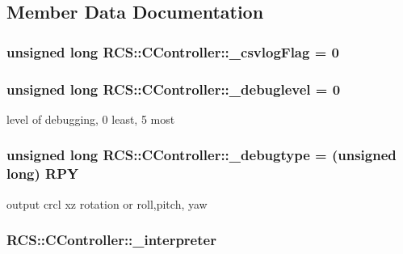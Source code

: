 \subsection{Member Data Documentation}
\hypertarget{structRCS_1_1CController_ab52a91aa3bfa1f56b527217f09c66912}{
\subsubsection[{\-\_\-csvlog\-Flag}]{\setlength{\rightskip}{0pt plus 5cm}unsigned long R\-C\-S\-::\-C\-Controller\-::\-\_\-csvlog\-Flag = 0\hspace{0.3cm}{\ttfamily [static]}}}\label{structRCS_1_1CController_ab52a91aa3bfa1f56b527217f09c66912}
\hypertarget{structRCS_1_1CController_a1e7f92c361c961fae03b08986bc19a16}{
\subsubsection[{\-\_\-debuglevel}]{\setlength{\rightskip}{0pt plus 5cm}unsigned long R\-C\-S\-::\-C\-Controller\-::\-\_\-debuglevel = 0\hspace{0.3cm}{\ttfamily [static]}}}\label{structRCS_1_1CController_a1e7f92c361c961fae03b08986bc19a16}
level of debugging, 0 least, 5 most \hypertarget{structRCS_1_1CController_ae4ff5cead0f30ebf8dcbc850b342afc4}{
\subsubsection[{\-\_\-debugtype}]{\setlength{\rightskip}{0pt plus 5cm}unsigned long R\-C\-S\-::\-C\-Controller\-::\-\_\-debugtype = (unsigned long) {\bf R\-P\-Y}\hspace{0.3cm}{\ttfamily [static]}}}\label{structRCS_1_1CController_ae4ff5cead0f30ebf8dcbc850b342afc4}
output crcl xz rotation or roll,pitch, yaw \hypertarget{structRCS_1_1CController_a4c3c287cebfd9fa9fb413205fa0b49f6}{
\subsubsection[{\-\_\-interpreter}]{ R\-C\-S\-::\-C\-Controller\-::\-\_\-interpreter}}\label{structRCS_1_1CController_a4c3c287cebfd9fa9fb413205fa0b49f6}
